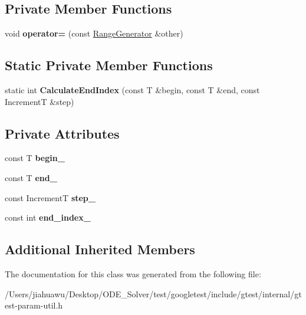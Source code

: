 \subsection*{Private Member Functions}
\begin{DoxyCompactItemize}
\item 
\mbox{\label{classtesting_1_1internal_1_1_range_generator_a00ef0f268e44d48d129a52bf0f9f9539}} 
void {\bfseries operator=} (const \mbox{\hyperlink{classtesting_1_1internal_1_1_range_generator}{Range\+Generator}} \&other)
\end{DoxyCompactItemize}
\subsection*{Static Private Member Functions}
\begin{DoxyCompactItemize}
\item 
\mbox{\label{classtesting_1_1internal_1_1_range_generator_af617ad3b3e40bef967f1055dc7ae8ae6}} 
static int {\bfseries Calculate\+End\+Index} (const T \&begin, const T \&end, const IncrementT \&step)
\end{DoxyCompactItemize}
\subsection*{Private Attributes}
\begin{DoxyCompactItemize}
\item 
\mbox{\label{classtesting_1_1internal_1_1_range_generator_af16307fd21766bcbb973d8b3335f1a3f}} 
const T {\bfseries begin\+\_\+}
\item 
\mbox{\label{classtesting_1_1internal_1_1_range_generator_ac36eecbaf80b51a59d59a4a4fdf5b5db}} 
const T {\bfseries end\+\_\+}
\item 
\mbox{\label{classtesting_1_1internal_1_1_range_generator_ae7f3c4b76d8610f030fdd12285ebd8fb}} 
const IncrementT {\bfseries step\+\_\+}
\item 
\mbox{\label{classtesting_1_1internal_1_1_range_generator_a336878a1871133e49665df60ea944076}} 
const int {\bfseries end\+\_\+index\+\_\+}
\end{DoxyCompactItemize}
\subsection*{Additional Inherited Members}


The documentation for this class was generated from the following file\+:\begin{DoxyCompactItemize}
\item 
/\+Users/jiahuawu/\+Desktop/\+O\+D\+E\+\_\+\+Solver/test/googletest/include/gtest/internal/gtest-\/param-\/util.\+h\end{DoxyCompactItemize}
